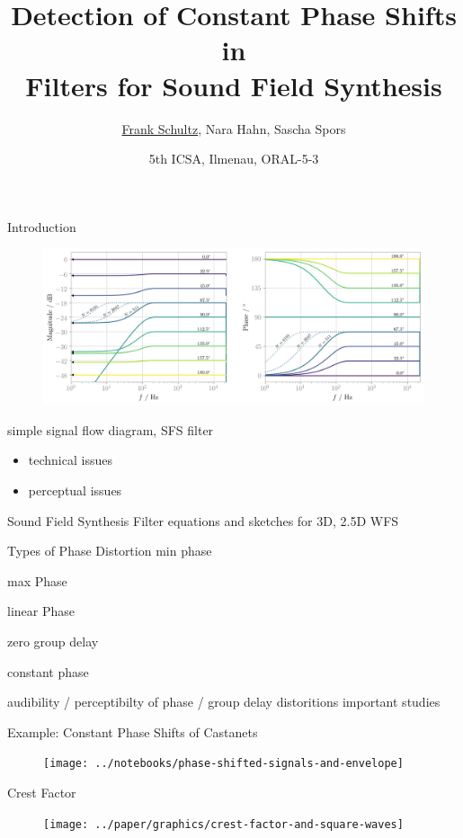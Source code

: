 \documentclass[mathserif]{intbeamer}
\title[Audibility Constant Phase Shifts]%
  {Detection of Constant Phase Shifts in\\Filters for Sound Field Synthesis}
\author[Schultz et al.]{%
    \underline{Frank Schultz},
    Nara Hahn,
    Sascha Spors
}
\date[2019-09-28]{%
  5th ICSA, Ilmenau, ORAL-5-3\\
}
\institute[]{Institute of Communications Engineering, University of Rostock}
\begin{document}
\maketitle
%
%
%
\begin{frame}{Introduction}
\begin{figure}
\includegraphics[width=\textwidth]{../paper/graphics/spectra_filterorder510}
\end{figure}
simple signal flow diagram, SFS filter

\begin{itemize}
\item  technical issues
\item perceptual issues
\end{itemize}
\end{frame}
%
%
%
\begin{frame}{Sound Field Synthesis Filter}
equations and sketches for 3D, 2.5D WFS
\end{frame}
%
%
%
\begin{frame}{Types of Phase Distortion}
min phase

max Phase

linear Phase

zero group delay

constant phase

audibility / perceptibilty of phase / group delay distoritions
important studies

\end{frame}
%
%
%
\begin{frame}{Example: Constant Phase Shifts of Castanets}
\begin{figure}
\texttt{[image: ../notebooks/phase-shifted-signals-and-envelope]}
\end{figure}
\end{frame}
%
%
%
\begin{frame}{Crest Factor}
\begin{figure}
\texttt{[image: ../paper/graphics/crest-factor-and-square-waves]}
\end{figure}
\end{frame}
\end{document}
